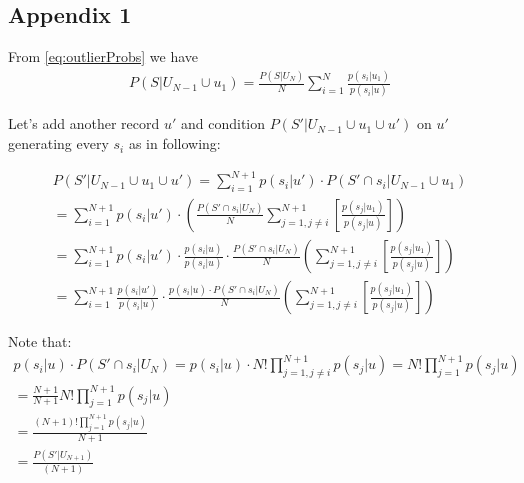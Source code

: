 \documentclass[11pt]{article}
\begin{document}
\subsection{Appendix 1}

From  \eqref{eq:outlierProbs} we have
\begin{align}
P(S|U_{N-1} \cup u_1) =  \frac{ P(S|U_N)} {N} \sum_{i=1}^N  \frac{ p(s_i | u_1) } { p(s_i | u) }
\end{align} 

Let's add another record $u'$ and condition $P(S'|U_{N-1} \cup u_1 \cup u' )$ on $u'$ generating every $s_i$ as in following:

\begin{align}
P(S'|U_{N-1} \cup u_1 \cup u' ) =  \sum_{i=1}^{N+1} p(s_i|u')  \cdot P(S' \cap s_i | U_{N-1} \cup u_1) \\
=  \sum_{i=1}^{N+1} p(s_i|u')  \cdot \left ( \frac{P(S'  \cap s_i |U_N)}{N}  \sum_{j=1, j\ne i}^{N+1} \left [ \frac{p(s_j|u_1)}{p(s_j|u)} \right ] \right  ) \\
=  \sum_{i=1}^{N+1} p(s_i|u')  \cdot \frac{p(s_i|u)}{p(s_i|u)} \cdot \frac{P(S'  \cap s_i |U_N)}{N}  \left (  \sum_{j=1, j\ne i}^{N+1} \left [ \frac{p(s_j|u_1)}{p(s_j|u)} \right ] \right  ) \\
= \sum_{i=1}^{N+1}  \frac{p(s_i|u')}{p(s_i|u)} \cdot \frac{p(s_i|u) \cdot P(S'  \cap s_i |U_N)}{N}  \left (  \sum_{j=1, j\ne i}^{N+1} \left [ \frac{p(s_j|u_1)}{p(s_j|u)} \right ] \right  ) 
\end{align} 

Note that:
\begin{align}
 p(s_i|u) \cdot P(S'  \cap s_i |U_N) = p(s_i|u) \cdot N! \prod_{j=1,j \ne i}^{N+1} p(s_j|u) = N!  \prod_{j=1}^{N+1} p(s_j|u) \\
 = \frac{N+1}{N+1} N!  \prod_{j=1}^{N+1} p(s_j|u) \\
 = \frac{(N+1)!  \prod_{j=1}^{N+1} p(s_j|u)}{N+1} \\
 =  \frac{P(S'|U_{N+1})}{(N+1)} \\
\end{align}
\end{document}
